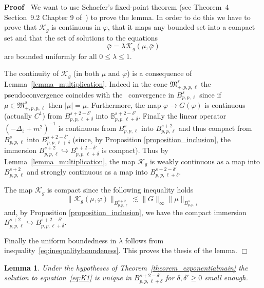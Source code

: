 \documentclass[a4paper,10pt]{article}
\newenvironment{proof}{\noindent\textbf{Proof\ }}{\hspace*{\fill}$\Box$\medskip}
\newtheorem{lemma}{Lemma}
\begin{document}
\begin{proof}
  We want to use Schaefer's fixed-point theorem (see Theorem~4 Section~9.2
  Chapter 9 of~{\cite{Evans1998}}) to prove the lemma. In order to do this we
  have to prove that $\mathcal{K}_g$ is continuous in $\varphi$, that it maps
  any bounded set into a compact set and that the set of solutions to the
  equations
  \[ \bar{\varphi} = \lambda \mathcal{K}_g (\mu, \bar{\varphi}) \]
  are bounded uniformly for all $0 \leqslant \lambda \leqslant 1$.
  
  The continuity of $\mathcal{K}_g$ (in both $\mu$ and $\varphi$) is a
  consequence of Lemma~\ref{lemma_multiplication}. Indeed in the cone
  $\mathfrak{M}^s_{+, p, p, \ell}$ the pseudoconvergence coincides with the \
  convergence in $B^s_{p, p, \ell}$ since if $\mu \in \mathfrak{M}^s_{+, p, p,
  \ell}$ then $| \mu | = \mu$. Furthermore, the map $\varphi \rightarrow G
  (\varphi)$ is continuous (actually $C^1$) from $B^{s + 2 - \delta'}_{p, p,
  \ell + \delta}$ into $\mathbb{B}^{s + 2 - \delta'}_{p, p, \ell + \delta}$.
  Finally the linear operator $(- \Delta_{\hat{z}} + m^2)^{- 1}$ is continuous
  from $B^s_{p, p, \ell}$ into $B^{s + 2}_{p, p, \ell}$ and thus compact from
  $B^s_{p, p, \ell}$ into $B^{s + 2 - \delta'}_{p, p, \ell + \delta}$ (since,
  by Proposition \ref{proposition_inclusion}, the immersion $B^{s + 2}_{p, p,
  \ell} \hookrightarrow B^{s + 2 - \delta'}_{p, p, \ell + \delta}$ is
  compact). Thus by Lemma~\ref{lemma_multiplication}, the map $\mathcal{K}_g$
  is weakly continuous as a map into $B^{s + 2}_{p, p, \ell}$ and strongly
  continuous as a map into $B^{s + 2 - \delta'}_{p, p, \ell + \delta}$.
  
  The map $\mathcal{K}_g$ is compact since the following inequality holds
  \begin{equation}
    \| \mathcal{K}_g (\mu, \varphi) \|_{B^{s + 2}_{p, p, \ell}} \lesssim \| G
    \|_{\infty} \| \mu \|_{B^s_{p, p, \ell}} \label{eq:inequalityboundeness}
  \end{equation}
  and, by Proposition \ref{proposition_inclusion}, we have the compact
  immersion $B^{s + 2}_{p, p, \ell} \hookrightarrow B^{s + 2 - \delta'}_{p, p,
  \ell + \delta}$.
  
  Finally the uniform boundedness in $\lambda$ follows from
  inequality~{\eqref{eq:inequalityboundeness}}. This proves the thesis of the
  lemma.
\end{proof}

\begin{lemma}
  \label{lemma_exponentialuniqueness}Under the hypotheses of
  Theorem~\ref{theorem_exponentialmain} the solution to
  equation~{\eqref{eq:K1}} is unique in $B^{s + 2 - \delta'}_{p, p, \ell +
  \delta}$ for $\delta, \delta' \geqslant 0$ small enough.
\end{lemma}
\end{document}
